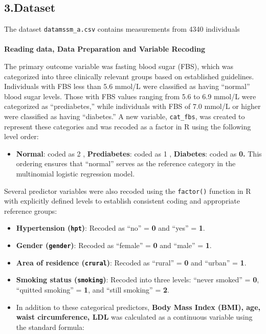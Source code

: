 \documentclass[
  letterpaper,
  DIV=11,
  numbers=noendperiod]{scrartcl}
\makeatletter
\let\oldparagraph\paragraph
\renewcommand{\paragraph}{
    \@ifstar
      \xxxParagraphStar
      \xxxParagraphNoStar
  }
\newcommand{\xxxParagraphStar}[1]{\oldparagraph*{#1}\mbox{}}
\newcommand{\xxxParagraphNoStar}[1]{\oldparagraph{#1}\mbox{}}
\providecommand{\tightlist}{%
  \setlength{\itemsep}{0pt}\setlength{\parskip}{0pt}}\usepackage{longtable,booktabs,array}
\makeatother
\begin{document}
\subsection{3.Dataset}\label{dataset}

The dataset \texttt{datamssm\_a.csv} contains measurements from 4340
individuals

\paragraph{\texorpdfstring{\textbf{Reading data, Data Preparation and
Variable
Recoding}}{Reading data, Data Preparation and Variable Recoding}}\label{reading-data-data-preparation-and-variable-recoding}

The primary outcome variable was fasting blood sugar (FBS), which was
categorized into three clinically relevant groups based on established
guidelines. Individuals with FBS less than 5.6 mmol/L were classified as
having ``normal'' blood sugar levels. Those with FBS values ranging from
5.6 to 6.9 mmol/L were categorized as ``prediabetes,'' while individuals
with FBS of 7.0 mmol/L or higher were classified as having ``diabetes.''
A new variable, \texttt{cat\_fbs}, was created to represent these
categories and was recoded as a factor in R using the following level
order:

\begin{itemize}
\tightlist
\item
  \textbf{Normal}: coded as 2 , \textbf{Prediabetes}: coded as 1 ,
  \textbf{Diabetes}: coded as \textbf{0.} This ordering ensures that
  ``normal'' serves as the reference category in the multinomial
  logistic regression model.
\end{itemize}

Several predictor variables were also recoded using the
\texttt{factor()} function in R with explicitly defined levels to
establish consistent coding and appropriate reference groups:

\begin{itemize}
\item
  \textbf{Hypertension (\texttt{hpt})}: Recoded as ``no'' = \textbf{0}
  and ``yes'' = \textbf{1}.
\item
  \textbf{Gender (\texttt{gender})}: Recoded as ``female'' = \textbf{0}
  and ``male'' = \textbf{1}.
\item
  \textbf{Area of residence (\texttt{crural})}: Recoded as ``rural'' =
  \textbf{0} and ``urban'' = \textbf{1}.
\item
  \textbf{Smoking status (\texttt{smoking})}: Recoded into three levels:
  ``never smoked'' = \textbf{0}, ``quitted smoking'' = \textbf{1}, and
  ``still smoking'' = \textbf{2}.
\item
  In addition to these categorical predictors, \textbf{Body Mass Index
  (BMI), age, waist circumference, LDL} was calculated as a continuous
  variable using the standard formula:
\end{itemize}
\end{document}
